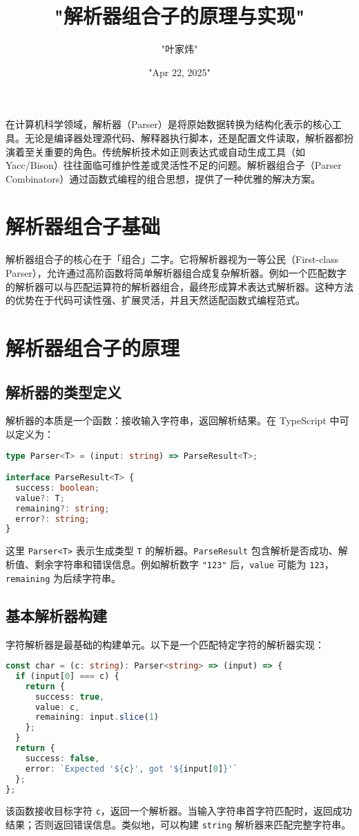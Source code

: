 \title{"解析器组合子的原理与实现"}
\author{"叶家炜"}
\date{"Apr 22, 2025"}
\maketitle
在计算机科学领域，解析器（Parser）是将原始数据转换为结构化表示的核心工具。无论是编译器处理源代码、解释器执行脚本，还是配置文件读取，解析器都扮演着至关重要的角色。传统解析技术如正则表达式或自动生成工具（如 Yacc/Bison）往往面临可维护性差或灵活性不足的问题。解析器组合子（Parser Combinators）通过函数式编程的组合思想，提供了一种优雅的解决方案。\par
\chapter{解析器组合子基础}
解析器组合子的核心在于「组合」二字。它将解析器视为一等公民（First-class Parser），允许通过高阶函数将简单解析器组合成复杂解析器。例如一个匹配数字的解析器可以与匹配运算符的解析器组合，最终形成算术表达式解析器。这种方法的优势在于代码可读性强、扩展灵活，并且天然适配函数式编程范式。\par
\chapter{解析器组合子的原理}
\section{解析器的类型定义}
解析器的本质是一个函数：接收输入字符串，返回解析结果。在 TypeScript 中可以定义为：\par
\begin{lstlisting}[language=typescript]
type Parser<T> = (input: string) => ParseResult<T>;

interface ParseResult<T> {
  success: boolean;
  value?: T;
  remaining?: string;
  error?: string;
}
\end{lstlisting}
这里 \verb!Parser<T>! 表示生成类型 \verb!T! 的解析器。\verb!ParseResult! 包含解析是否成功、解析值、剩余字符串和错误信息。例如解析数字 \verb!"123"! 后，\verb!value! 可能为 \verb!123!，\verb!remaining! 为后续字符串。\par
\section{基本解析器构建}
字符解析器是最基础的构建单元。以下是一个匹配特定字符的解析器实现：\par
\begin{lstlisting}[language=typescript]
const char = (c: string): Parser<string> => (input) => {
  if (input[0] === c) {
    return {
      success: true,
      value: c,
      remaining: input.slice(1)
    };
  }
  return {
    success: false,
    error: `Expected '${c}', got '${input[0]}'`
  };
};
\end{lstlisting}
该函数接收目标字符 \verb!c!，返回一个解析器。当输入字符串首字符匹配时，返回成功结果；否则返回错误信息。类似地，可以构建 \verb!string! 解析器来匹配完整字符串。\par
